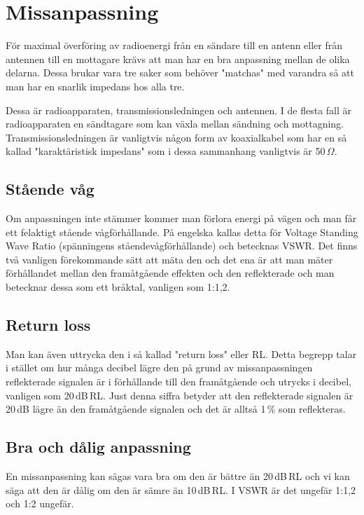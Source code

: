 \section{Missanpassning}

För maximal överföring av radioenergi från en sändare till en antenn eller
från antennen till en mottagare krävs att man har en bra anpassning mellan de
olika delarna. Dessa brukar vara tre saker som behöver "matchas" med varandra
så att man har en snarlik impedans hos alla tre.

Dessa är radioapparaten, transmissionsledningen och antennen. I de flesta fall
är radioapparaten en sändtagare som kan växla mellan sändning och mottagning.
Transmissionsledningen är vanligtvis någon form av koaxialkabel som har en så
kallad "karaktäristisk impedans" som i dessa sammanhang vanligtvis är
50\,$\Omega$.

\subsection{Stående våg}

Om anpassningen inte stämmer kommer man förlora energi på vägen och man får
ett felaktigt stående vågförhållande. På engelska kallas detta för Voltage
Standing Wave Ratio (spänningens ståendevågförhållande) och betecknas VSWR.
Det finns två vanligen förekommande sätt att mäta den och det ena är att man
mäter förhållandet mellan den framåtgående effekten och den reflekterade och
man betecknar dessa som ett bråktal, vanligen som 1:1,2.

\subsection{Return loss}

Man kan även uttrycka den i så kallad "return loss" eller RL. Detta begrepp
talar i stället om hur många decibel lägre den på grund av missanpassningen
reflekterade signalen är i förhållande till den framåtgående och utrycks i
decibel, vanligen som 20\,dB\,RL. Just denna siffra betyder att den
reflekterade signalen är 20\,dB lägre än den framåtgående signalen och det är
alltså 1\,\% som reflekteras.

\subsection{Bra och dålig anpassning}

En missanpassning kan sägas vara bra om den är bättre än 20\,dB\,RL och vi kan
säga att den är dålig om den är sämre än 10\,dB\,RL. I VSWR är det ungefär
1:1,2 och 1:2 ungefär.

